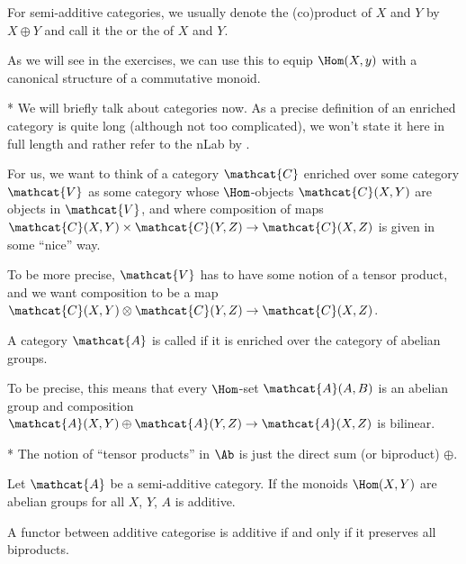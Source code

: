 \begin{remark}
  For semi-additive categories, we usually denote the (co)product of
  $X$ and  $Y$ by  $X \oplus Y$ and call it the 
  or the  of $X$ and  $Y$. 

  As we will see in the exercises, we can use this to equip $\Hom(X,y)$
  with a canonical structure of a commutative monoid.
\end{remark}

\begin{remark}*
  We will briefly talk about  categories now.
  As a precise definition of an enriched category is quite long
  (although not too complicated),
  we won't state it here in full length and rather refer to the
  nLab by
  \cite{nlab:enriched+category}.

  For us, we want to think of a category $\mathcat{C}$ enriched
  over some category $\mathcat{V}$ as some category whose
  $\Hom$-objects  $\mathcat{C}(X,Y)$ are objects in $\mathcat{V}$,
  and where composition of maps
  $\mathcat{C}(X,Y) \times \mathcat{C}(Y,Z) \to \mathcat{C}(X,Z)$
  is given in some \enquote{nice} way.
  
  To be more precise, $\mathcat{V}$ has to have some notion of
  a tensor product, and we want composition to be a map
  $\mathcat{C}(X,Y) \otimes \mathcat{C}(Y,Z) \to \mathcat{C}(X,Z)$.
\end{remark}

\begin{definition}
  A category $\mathcat{A}$ is called  if it is enriched
  over the category of abelian groups.

  To be precise, this means that every $\Hom$-set $\mathcat{A}(A,B)$ 
  is an abelian group and composition
  $\mathcat{A}(X,Y) \oplus \mathcat{A}(Y,Z) \to \mathcat{A}(X,Z)$
  is bilinear.
\end{definition}

\begin{remark}*
  The notion of \enquote{tensor products} in  $\Ab$
  is just the direct sum (or biproduct) $\oplus$.
\end{remark}

\begin{lemma}
  Let $\mathcat{A}$ be a semi-additive category.
  If the monoids $\Hom(X,Y)$ are abelian groups for all  $X$,  $Y$,
  $A$ is additive.

  A functor between additive categorise is additive if and only
  if it preserves all biproducts.
\end{lemma}

